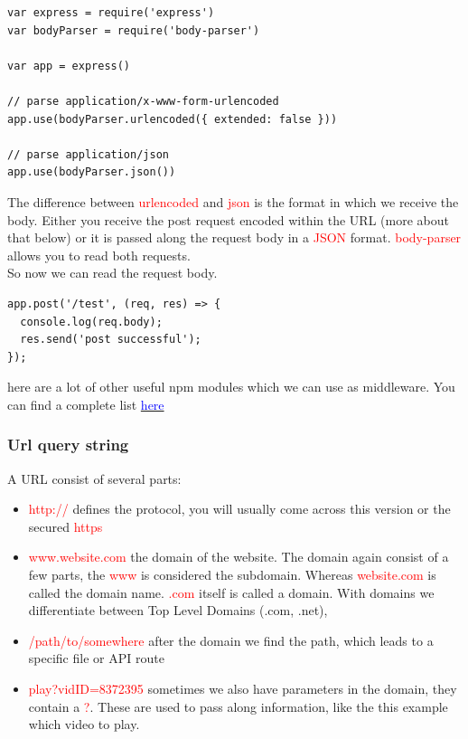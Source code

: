 \documentclass[a4paper]{article}
\begin{document}
\begin{lstlisting}
var express = require('express')
var bodyParser = require('body-parser')

var app = express()

// parse application/x-www-form-urlencoded
app.use(bodyParser.urlencoded({ extended: false }))

// parse application/json
app.use(bodyParser.json())
\end{lstlisting}
The difference between \textcolor{red}{urlencoded} and \textcolor{red}{json} is the format in which we receive the body. Either you receive the post request encoded within the URL (more about that below) or it is passed along the request body in a \textcolor{red}{JSON} format. \textcolor{red}{body-parser} allows you to read both requests.\\

So now we can read the request body.

\begin{lstlisting}
app.post('/test', (req, res) => {
  console.log(req.body);
  res.send('post successful');
});
\end{lstlisting}
here are a lot of other useful npm modules which we can use as middleware. You can find a complete list \href{https://expressjs.com/en/resources/middleware.html}{\textcolor{blue}{here}}
\subsubsection{Url query string}
A URL consist of several parts:
\begin{itemize}
\item \textcolor{red}{http://} defines the protocol, you will usually come across this version or the secured \textcolor{red}{https}
\item \textcolor{red}{www.website.com}  the domain of the website. The domain again consist of a few parts, the \textcolor{red}{www} is considered the subdomain. Whereas \textcolor{red}{website.com} is called the domain name. \textcolor{red}{.com} itself is called a domain. With domains we differentiate between Top Level Domains (.com, .net), 
\item \textcolor{red}{/path/to/somewhere} after the domain we find the path, which leads to a specific file or API route
\item \textcolor{red}{play?vidID=8372395} sometimes we also have parameters in the domain, they contain a \textcolor{red}{?}. These are used to pass along information, like the this example which video to play.
\end{itemize}
\end{document}
